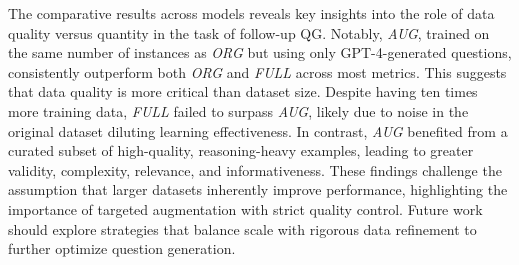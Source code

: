 The comparative results across models reveals key insights into the role of data quality versus quantity in the task of follow-up QG. Notably, \textit{AUG}, trained on the same number of instances as \textit{ORG} but using only GPT-4-generated questions, consistently outperform both \textit{ORG} and \textit{FULL} across most metrics. This suggests that data quality is more critical than dataset size. Despite having ten times more training data, \textit{FULL} failed to surpass \textit{AUG}, likely due to noise in the original dataset diluting learning effectiveness. In contrast, \textit{AUG} benefited from a curated subset of high-quality, reasoning-heavy examples, leading to greater validity, complexity, relevance, and informativeness. These findings challenge the assumption that larger datasets inherently improve performance, highlighting the importance of targeted augmentation with strict quality control. Future work should explore strategies that balance scale with rigorous data refinement to further optimize question generation.


